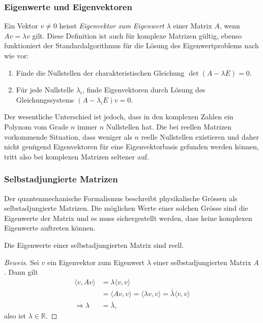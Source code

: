 \subsubsection{Eigenwerte und Eigenvektoren}
Ein Vektor $v\ne 0$ heisst {\em Eigenvektor zum Eigenwert} $\lambda$ einer
Matrix $A$, wenn $Av=\lambda v$ gilt. Diese Definition ist auch für
komplexe Matrizen gültig, ebenso funktioniert der Standardalgorithmus
für die Lösung des Eigenwertproblems nach wie vor:
\begin{enumerate}
\item Finde die Nullstellen der charakteristischen Gleichung
$\det(A-\lambda E)=0$.
\item Für jede Nullstelle $\lambda_i$, finde Eigenvektoren
durch Lösung des Gleichungssystems $(A-\lambda_i E)v=0$.
\end{enumerate}
Der wesentliche Unterschied ist jedoch, dass in den komplexen
Zahlen ein Polynom vom Grade $n$ immer $n$ Nullstellen hat.
Die bei reellen Matrizen vorkommende Situation, dass weniger
als $n$ reelle Nullstellen existieren und daher nicht genügend
Eigenvektoren für eine Eigenvektorbasis gefunden werden können,
tritt also bei komplexen Matrizen seltener auf.

\subsubsection{Selbstadjungierte Matrizen}
Der quantenmechanische Formalismus beschreibt physikalische Grössen
als selbstadjungierte Matrizen. Die möglichen Werte einer solchen Grösse
sind die Eigenwerte der Matrix und es muss sichergestellt werden,
dass keine komplexen Eigenwerte auftreten können.

\begin{satz}
\label{skript:ewreell}
Die Eigenwerte einer selbstadjungierten Matrix sind reell.
\end{satz}
\begin{proof}[Beweis]
Sei $v$ ein Eigenvektor zum Eigenwert $\lambda$ einer selbstadjungierten
Matrix $A$. Dann gilt
\begin{align*}
\langle v,Av\rangle
&=
\lambda\langle v,v\rangle
\\
&=\langle Av,v\rangle=\langle \lambda v,v\rangle=\bar\lambda\langle v,v \rangle
\\
\Rightarrow \lambda&=\bar\lambda,
\end{align*}
also ist $\lambda\in\mathbb R$.
\end{proof}

